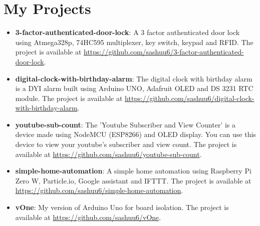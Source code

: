 \documentclass[letterpaper,11pt]{article}
\newcommand{\resumeItem}[2]{
  \item\small{
    \textbf{#1}{: #2 \vspace{-2pt}}
  }
}
\newcommand{\resumeSubItem}[2]{\resumeItem{#1}{#2}\vspace{-4pt}}
\newcommand{\resumeSubHeadingListStart}{\begin{itemize}[leftmargin=*]}
\newcommand{\resumeSubHeadingListEnd}{\end{itemize}}
\begin{document}
\section{My Projects}
  \resumeSubHeadingListStart
    \resumeSubItem{3-factor-authenticated-door-lock}
      { A 3 factor authenticated door lock using Atmega328p, 74HC595 multiplexer, key switch, keypad and RFID. The project is available at \url{https://github.com/sashuu6/3-factor-authenticated-door-lock}.}
    \resumeSubItem{digital-clock-with-birthday-alarm}
      {The digital clock with birthday alarm is a DYI alarm built using Arduino UNO, Adafruit OLED and DS 3231 RTC module. The project is available at \url{https://github.com/sashuu6/digital-clock-with-birthday-alarm}.}
    \resumeSubItem{youtube-sub-count}
      {The 'Youtube Subscriber and View Counter' is a device made using NodeMCU (ESP8266) and OLED display. You can use this device to view your youtube's subscriber and view count. The project is available at \url{https://github.com/sashuu6/youtube-sub-count}.}
    \resumeSubItem{simple-home-automation}
      {A simple home automation using Raspberry Pi Zero W, Particle.io, Google assistant and IFTTT. The project is available at \url{https://github.com/sashuu6/simple-home-automation}.}
      \resumeSubItem{vOne}
      {My version of Arduino Uno for board isolation. The project is available at \url{https://github.com/sashuu6/vOne}.}
  \resumeSubHeadingListEnd

\end{document}
